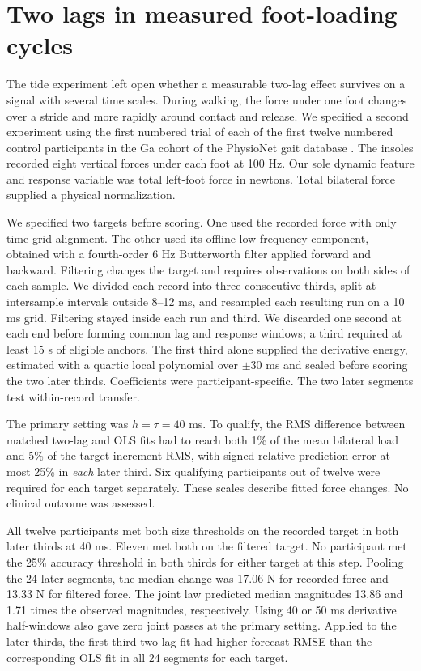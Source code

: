 \section{Two lags in measured foot-loading cycles}
The tide experiment left open whether a measurable two-lag effect survives on a signal with several time scales. During walking, the force under one foot changes over a stride and more rapidly around contact and release. We specified a second experiment using the first numbered trial of each of the first twelve numbered control participants in the Ga cohort of the PhysioNet gait database \cite{gait,physionet}. The insoles recorded eight vertical forces under each foot at 100 Hz. Our sole dynamic feature and response variable was total left-foot force in newtons. Total bilateral force supplied a physical normalization.

We specified two targets before scoring. One used the recorded force with only time-grid alignment. The other used its offline low-frequency component, obtained with a fourth-order 6 Hz Butterworth filter applied forward and backward. Filtering changes the target and requires observations on both sides of each sample. We divided each record into three consecutive thirds, split at intersample intervals outside 8--12 ms, and resampled each resulting run on a 10 ms grid. Filtering stayed inside each run and third. We discarded one second at each end before forming common lag and response windows; a third required at least 15 s of eligible anchors. The first third alone supplied the derivative energy, estimated with a quartic local polynomial over $\pm30$ ms and sealed before scoring the two later thirds. Coefficients were participant-specific. The two later segments test within-record transfer.

The primary setting was $h=\tau=40$ ms. To qualify, the RMS difference between matched two-lag and OLS fits had to reach both 1\% of the mean bilateral load and 5\% of the target increment RMS, with signed relative prediction error at most 25\% in \emph{each} later third. Six qualifying participants out of twelve were required for each target separately. These scales describe fitted force changes. No clinical outcome was assessed.

All twelve participants met both size thresholds on the recorded target in both later thirds at 40 ms. Eleven met both on the filtered target. No participant met the 25\% accuracy threshold in both thirds for either target at this step. Pooling the 24 later segments, the median change was 17.06 N for recorded force and 13.33 N for filtered force. The joint law predicted median magnitudes 13.86 and 1.71 times the observed magnitudes, respectively. Using 40 or 50 ms derivative half-windows also gave zero joint passes at the primary setting. Applied to the later thirds, the first-third two-lag fit had higher forecast RMSE than the corresponding OLS fit in all 24 segments for each target.

